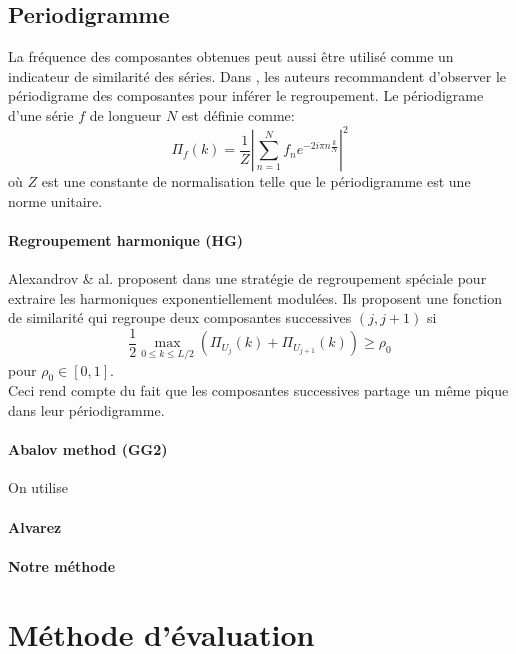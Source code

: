 \documentclass{gretsi}
\begin{document}
\subsection{Periodigramme}

La fréquence des composantes obtenues peut aussi être utilisé comme un indicateur de similarité des séries. Dans \cite{GNZ_10_SSA}, les auteurs recommandent d'observer le périodigrame des composantes pour inférer le regroupement. Le périodigrame d'une série $f$ de longueur $N$ est définie comme:$$
\Pi_f(k) = \frac{1}{Z}\left|\sum_{n=1}^N f_n e^{-2i\pi n \frac{k}{N}}\right|^2
$$ où $Z$ est une constante de normalisation telle que le périodigramme est une norme unitaire.\\

\paragraph{Regroupement harmonique (HG)}\label{par:alex} Alexandrov \& al. proposent dans \cite{alexandrov_05_auto} une stratégie de regroupement spéciale pour extraire les harmoniques exponentiellement modulées. Ils proposent une fonction de similarité qui regroupe deux composantes successives $(j, j+1)$ si$$
\frac{1}{2}\max_{0\le k \le L/2}\left(\Pi_{U_j}(k) + \Pi_{U_{j+1}}(k)\right) \ge \rho_0
$$ pour $\rho_0\in \left[0, 1\right]$.\\

Ceci rend compte du fait que les composantes successives partage un même pique dans leur périodigramme.


\paragraph{Abalov method (GG2)}
\label{par:abalov}
\cite{abalov_14_auto}
On utilise
\paragraph{Alvarez}
\label{par:alva}
\cite{alvarez_2013_auto}
\paragraph{Notre méthode}
\label{par:tomtom}


        

\section{Méthode d'évaluation}
\label{sec:eval}
\end{document}
